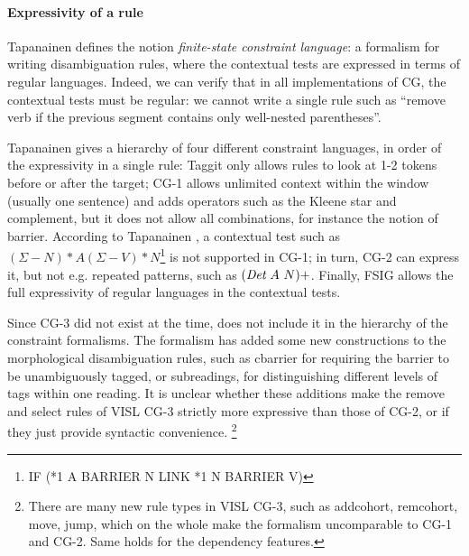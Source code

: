 \paragraph{Expressivity of a rule}

Tapanainen \cite{tapanainen1999phd} defines the notion \emph{finite-state constraint language}: a formalism for writing disambiguation rules, 
where the contextual tests are expressed in terms of regular languages.
Indeed, we can verify that in all implementations of CG, 
the contextual tests must be regular: we cannot write a single rule such as 
``remove verb if the previous segment contains only well-nested parentheses''.

Tapanainen gives a hierarchy of four different constraint languages, in order of the expressivity in a single rule: Taggit \cite{taggit} only allows rules to look at 1-2 tokens before or after the target; CG-1 \cite{karlsson1990cgp} allows unlimited context within the window (usually one sentence) and adds operators such as the Kleene star and complement, but it does not allow all combinations, for instance the notion of barrier. According to Tapanainen \cite{tapanainen1999phd}, a contextual test such as $(\Sigma - N)*A(\Sigma - V)*N$\footnote{IF (*1 A BARRIER N LINK *1 N BARRIER V)} is not supported in CG-1; in turn, CG-2 \cite{tapanainen1996} can express it, but not e.g. repeated patterns, such as $(\text{\em Det} \  A \  N)+$. Finally, FSIG \cite{koskenniemi90} allows the full expressivity of regular languages in the contextual tests.

Since CG-3 \cite{vislcg3,bick2015} did not exist at the time, \cite{tapanainen1999phd} does not include it in the hierarchy of the constraint formalisms.
The formalism has added some new constructions to the morphological disambiguation rules, 
such as {\sc cbarrier} for requiring the barrier to be unambiguously tagged, or subreadings, for distinguishing different levels of tags within one reading. 
It is unclear whether these additions make the {\sc remove} and {\sc select} rules of VISL CG-3 strictly more expressive than those of CG-2, or if they just provide syntactic convenience.
\footnote{There are many new rule types in VISL CG-3, such as {\sc addcohort}, {\sc remcohort}, {\sc move}, {\sc jump}, which on the whole make the formalism uncomparable to CG-1 and CG-2. Same holds for the dependency features.}




